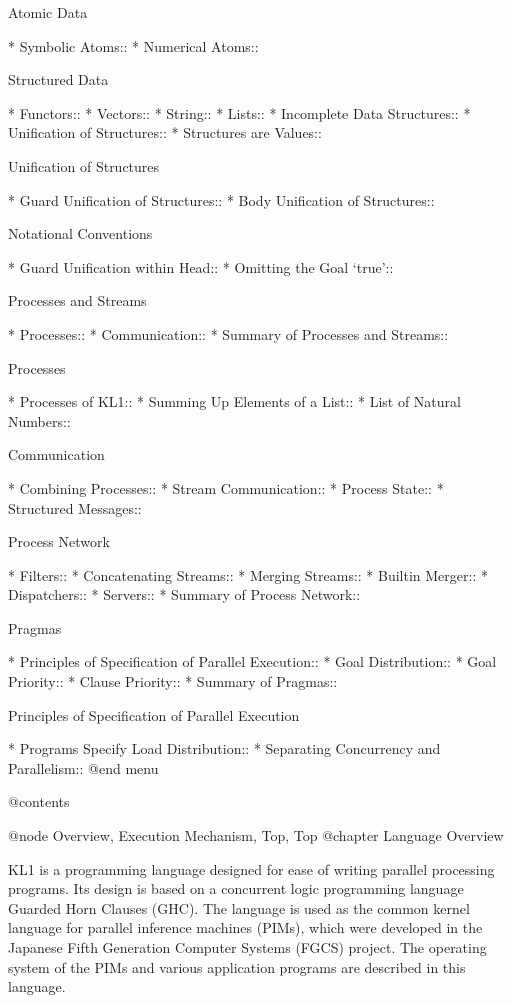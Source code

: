 Atomic Data

* Symbolic Atoms::              
* Numerical Atoms::             

Structured Data

* Functors::                    
* Vectors::                     
* String::                      
* Lists::                       
* Incomplete Data Structures::  
* Unification of Structures::   
* Structures are Values::       

Unification of Structures

* Guard Unification of Structures::  
* Body Unification of Structures::  

Notational Conventions

* Guard Unification within Head::  
* Omitting the Goal `true'::    

Processes and Streams

* Processes::                   
* Communication::               
* Summary of Processes and Streams::  

Processes

* Processes of KL1::            
* Summing Up Elements of a List::  
* List of Natural Numbers::     

Communication

* Combining Processes::         
* Stream Communication::        
* Process State::               
* Structured Messages::         

Process Network

* Filters::                     
* Concatenating Streams::       
* Merging Streams::             
* Builtin Merger::              
* Dispatchers::                 
* Servers::                     
* Summary of Process Network::  

Pragmas

* Principles of Specification of Parallel Execution::  
* Goal Distribution::           
* Goal Priority::               
* Clause Priority::             
* Summary of Pragmas::          

Principles of Specification of Parallel Execution

* Programs Specify Load Distribution::  
* Separating Concurrency and Parallelism::  
@end menu

@contents

@node Overview, Execution Mechanism, Top, Top
@chapter Language Overview

KL1 is a programming language designed for ease of writing parallel
processing programs.  Its design is based on a concurrent logic
programming language Guarded Horn Clauses (GHC).  The language is used
as the common kernel language for parallel inference machines (PIMs),
which were developed in the Japanese Fifth Generation Computer Systems
(FGCS) project.  The operating system of the PIMs and various
application programs are described in this language.

